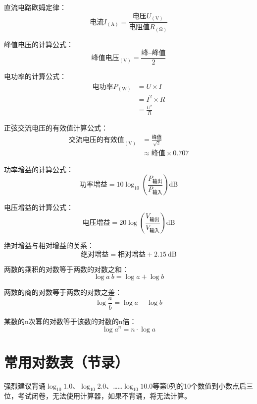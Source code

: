 直流电路欧姆定律：
\[\mbox{电流}I_{(\unit{\ampere})}=\frac{\mbox{电压}U_{(\unit{\volt})}}{\mbox{电阻值}R_{(\unit{\ohm})}}\]

峰值电压的计算公式：
\[\mbox{峰值电压}_{(\unit{\volt})}=\frac{\mbox{峰--峰值}}{2}\]

电功率的计算公式：
\begin{equation*}
  \begin{aligned}
    \mbox{电功率}P_{(\unit{\watt})} & = U\times I     \\
                                 & = I^2 \times R  \\
                                 & = \frac{U^2}{R}
  \end{aligned}
\end{equation*}

正弦交流电压的有效值计算公式：
\begin{equation*}
  \begin{aligned}
    \mbox{交流电压的有效值}_{(\unit{\volt})} & =\frac{\mbox{峰值}}{\sqrt{2}}   \\
                                     & \approx \mbox{峰值}\times 0.707
  \end{aligned}
\end{equation*}

功率增益的计算公式：
\[\mbox{功率增益}=10 \log_{10} \left( {\frac{P_{ \mbox{输出} }}{P_{ \mbox{输入} }}}\right) \unit{\dB}\]

电压增益的计算公式：
\[\mbox{电压增益}=20 \log \left( {\frac{V_{ \mbox{输出} }}{V_{ \mbox{输入} }}} \right) \unit{\dB}\]


绝对增益与相对增益的关系：
\[\mbox{绝对增益} = \mbox{相对增益} + \qty{2.15}{\dB}\]

两数的乘积的对数等于两数的对数之和：
\[\log a\: b=\log a+\log b\]

两数的商的对数等于两数的对数之差：
\[\log\frac{a}{b}=\log a-\log b\]

某数的n次幂的对数等于该数的对数的n倍：
\[\log a^n = n \cdot \log a\]

\newpage

\section{常用对数表（节录）}

强烈建议背诵$\log_{10} 1.0$、$\log_{10} 2.0$、……$\log_{10} 10.0$等第0列的10个数值到小数点后三位，考试闭卷，无法使用计算器，如果不背诵，将无法计算。

